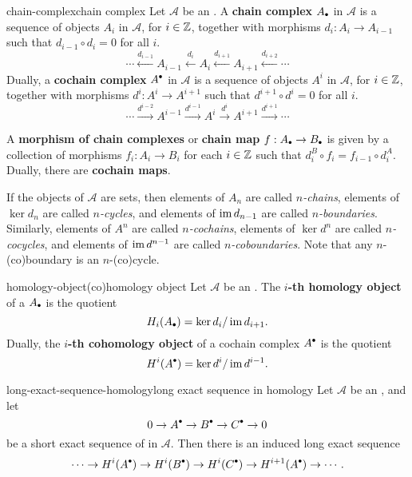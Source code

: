 \begin{topic}{chain-complex}{chain complex}
    Let $\mathcal{A}$ be an . A \textbf{chain complex} $A_\bdot$ in $\mathcal{A}$ is a sequence of objects $A_i$ in $\mathcal{A}$, for $i \in \mathbb{Z}$, together with morphisms $d_i : A_i \to A_{i - 1}$ such that $d_{i - 1} \circ d_i = 0$ for all $i$.
    \[ \cdots \xleftarrow{d_{i - 1}} A_{i - 1} \xleftarrow{d_i} A_i \xleftarrow{d_{i + 1}} A_{i + 1} \xleftarrow{d_{i + 2}} \cdots \]
    Dually, a \textbf{cochain complex} $A^\bdot$ in $\mathcal{A}$ is a sequence of objects $A^i$ in $\mathcal{A}$, for $i \in \mathbb{Z}$, together with morphisms $d^i : A^i \to A^{i + 1}$ such that $d^{i + 1} \circ d^i = 0$ for all $i$.
    \[ \cdots \xrightarrow{d^{i - 2}} A^{i - 1} \xrightarrow{d^{i - 1}} A^i \xrightarrow{d^i} A^{i + 1} \xrightarrow{d^{i + 1}} \cdots \]
    
    A \textbf{morphism of chain complexes} or \textbf{chain map} $f : A_\bdot \to B_\bdot$ is given by a collection of morphisms $f_i : A_i \to B_i$ for each $i \in \mathbb{Z}$ such that $d^B_i \circ f_i = f_{i - 1} \circ d^A_i$. Dually, there are \textbf{cochain maps}.
    
    If the objects of $\mathcal{A}$ are sets, then elements of $A_n$ are called \textit{$n$-chains}, elements of $\ker d_n$ are called \textit{$n$-cycles}, and elements of $\operatorname{im} d_{n - 1}$ are called \textit{$n$-boundaries}. Similarly, elements of $A^n$ are called \textit{$n$-cochains}, elements of $\ker d^n$ are called \textit{$n$-cocycles}, and elements of $\operatorname{im} d^{n - 1}$ are called \textit{$n$-coboundaries}. Note that any $n$-(co)boundary is an $n$-(co)cycle.
\end{topic}

\begin{topic}{homology-object}{(co)homology object}
    Let $\mathcal{A}$ be an . The \textbf{$i$-th homology object} of a  $A_\bdot$ is the quotient
    \[ H_i(A_\bdot) = \ker d_i / \im d_{i + 1} . \]
    Dually, the \textbf{$i$-th cohomology object} of a cochain complex $A^\bdot$ is the quotient
    \[ H^i(A^\bdot) = \ker d^i / \im d^{i - 1} . \]
\end{topic}

\begin{topic}{long-exact-sequence-homology}{long exact sequence in homology}
    Let $\mathcal{A}$ be an , and let
    \[ 0 \rightarrow A^\bdot \rightarrow B^\bdot \rightarrow C^\bdot \rightarrow 0 \]
    be a short exact sequence of  in $\mathcal{A}$. Then there is an induced long exact sequence
    \[ \cdots \rightarrow H^i(A^\bdot) \rightarrow H^i(B^\bdot) \rightarrow H^i(C^\bdot) \rightarrow H^{i + 1}(A^\bdot) \rightarrow \cdots . \]
\end{topic}

